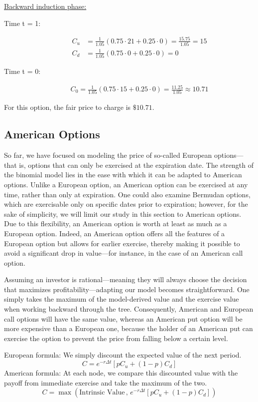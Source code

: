 \vspace{0.1cm}

\underline{Backward induction phase:} \\
\begin{description}
    \item[Time t = 1:]
        \begin{align*}
            C_u &= \frac{1}{1.05} (0.75 \cdot 21 + 0.25 \cdot 0) = \frac{15.75}{1.05} = 15\\
            C_d &= \frac{1}{1.05} (0.75 \cdot 0 + 0.25 \cdot 0) = 0
        \end{align*}
    \item[Time t = 0:]
\begin{align*}
C_0 = \frac{1}{1.05}(0.75 \cdot 15 + 0.25 \cdot 0) = \frac{11.25}{1.05} \approx 10.71
\end{align*}

\end{description}
For this option, the fair price to charge is $\$10.71$.
\subsection{American Options}
So far, we have focused on modeling the price of so-called European options—that is, options that can only be exercised at the expiration date.
The strength of the binomial model lies in the ease with which it can be adapted to American options. Unlike a European option,
an American option can be exercised at any time, rather than only at expiration. One could also examine Bermudan options, which are exercisable only on specific dates prior to expiration;
however, for the sake of simplicity, we will limit our study in this section to American options.
Due to this flexibility, an American option is worth at least as much as a European option. Indeed, an American option offers all the features of a European option
but allows for earlier exercise, thereby making it possible to avoid a significant drop in value—for instance, in the case of an American call option.

\vspace{0.1cm}

Assuming an investor is rational—meaning they will always choose the decision that maximizes profitability—adapting our model becomes straightforward.
One simply takes the maximum of the model-derived value and the exercise value when working backward through the tree. 
Consequently, American and European call options will have the same value, whereas an American put option will be more expensive than a European one, 
because the holder of an American put can exercise the option to prevent the price from falling below a certain level.

European formula: We simply discount the expected value of the next period.
    $$C = e^{-r \Delta t}[ p C_u + (1-p) C_d]$$
American formula: At each node, we compare this discounted value with the payoff from immediate exercise and take the maximum of the two.
    $$C = \max ( \text{Intrinsic Value} \, , \, e^{-r \Delta t} [ p C_u + (1-p) C_d ] )$$